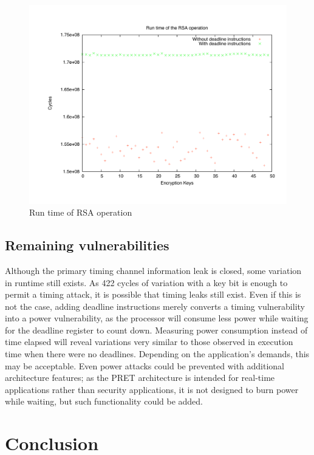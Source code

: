 \documentclass[times, 10pt,twocolumn]{article}
\begin{document}
\begin{figure}[ht]
  \centering
  \includegraphics[scale=.3]{./images/RSA.pdf}
  \caption{Run time of RSA operation}
  \label{fig:rsa}
\end{figure}

\subsection{Remaining vulnerabilities}
Although the primary timing channel information leak is closed, some variation in runtime still exists.  As 422 cycles of variation with a key bit is enough to permit a timing attack\cite{DKLMQW98}, it is possible that timing leaks still exist.  Even if this is not the case, adding deadline instructions merely converts a timing vulnerability into a power vulnerability, as the processor will consume less power while waiting for the deadline register to count down.  Measuring power consumption instead of time elapsed will reveal variations very similar to those observed in execution time when there were no deadlines.  Depending on the application's demands, this may be acceptable.  Even power attacks could be prevented with additional architecture features; as the PRET architecture is intended for real-time applications rather than security applications, it is not designed to burn power while waiting, but such functionality could be added.

\section{Conclusion}




\end{document}
